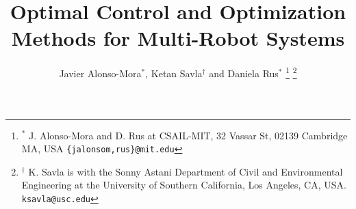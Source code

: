 \documentclass[letterpaper, 10 pt, conference]{ieeeconf}  %
\title{\LARGE \bf Optimal Control and Optimization Methods for Multi-Robot Systems}
\author{Javier Alonso-Mora$^{*}$, Ketan Savla$^{\dagger}$ and Daniela Rus$^{*}$%
\thanks{$^{*}$ J. Alonso-Mora and D. Rus at CSAIL-MIT, 32 Vassar St, 02139 Cambridge MA, USA
        {\tt\small \{jalonsom,rus\}@mit.edu}}%
\thanks{$^{\dagger}$ K. Savla is with the Sonny Astani Department of Civil and Environmental Engineering at the University of Southern California, Los Angeles, CA, USA.
        {\tt\small ksavla@usc.edu}}%
}
\begin{document}
\maketitle
\thispagestyle{empty}
\pagestyle{empty}

\begin{abstract}

\end{abstract}













%


% 
%
\end{document}
